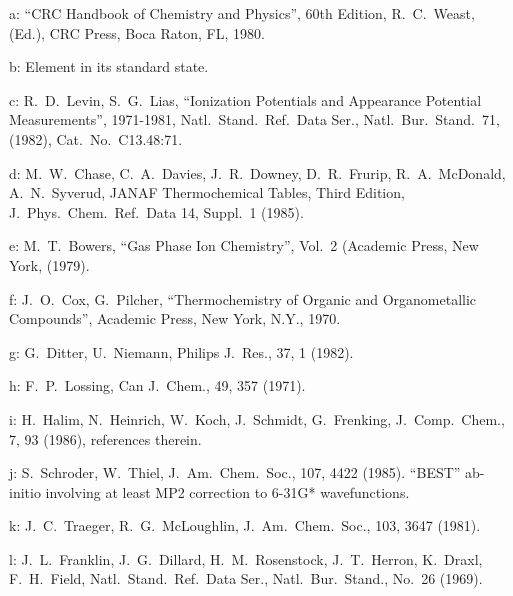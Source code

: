 \begin{description}
\item{   a: } ``CRC Handbook of Chemistry and Physics'', 60th Edition, R.\ C.\ Weast, (Ed.),
       CRC Press, Boca Raton, FL, 1980.
  
\item{   b: } Element in its standard state.
  
\item{   c: } R.\ D.\ Levin, S.\ G.\ Lias, ``Ionization Potentials and Appearance Potential
       Measurements'', 1971-1981, Natl.\ Stand.\ Ref.\ Data Ser., Natl.\ Bur.\
       Stand.\ 71, (1982), Cat.\ No.\ C13.48:71.
  
\item{   d: } M.\ W.\ Chase, C.\ A.\ Davies, J.\ R.\ Downey, D.\ R.\ Frurip, R.\ A.\ McDonald,
       A.\ N.\ Syverud, JANAF Thermochemical Tables, Third Edition,
       J.\ Phys.\ Chem.\ Ref.\ Data 14, Suppl.\ 1 (1985).
  
\item{   e: } M.\ T.\ Bowers, ``Gas Phase Ion Chemistry'', Vol.\ 2 (Academic Press, New York,
       (1979).
  
\item{   f: } J.\ O.\ Cox, G.\ Pilcher, ``Thermochemistry of Organic and Organometallic
       Compounds'', Academic Press, New York, N.Y., 1970.
  
\item{   g: } G.\ Ditter, U.\ Niemann, Philips J.\ Res., 37, 1 (1982).
  
\item{   h: } F.\ P.\ Lossing, Can J.\ Chem., 49, 357 (1971).
  
\item{   i: } H.\ Halim, N.\ Heinrich, W.\ Koch, J.\ Schmidt, G.\ Frenking, J.\ Comp.\ Chem.,
       7, 93 (1986), references therein.
  
\item{   j: } S.\ Schroder, W.\ Thiel, J.\ Am.\ Chem.\ Soc., 107, 4422 (1985). ``BEST'' ab-initio
       involving at least MP2 correction to 6-31G* wavefunctions.
  
\item{   k: } J.\ C.\ Traeger, R.\ G.\ McLoughlin, J.\ Am.\ Chem.\ Soc., 103, 3647 (1981).
  
\item{   l: } J.\ L.\ Franklin, J.\ G.\ Dillard, H.\ M.\ Rosenstock, J.\ T.\ Herron,
       K.\ Draxl, F.\ H.\ Field, Natl.\ Stand.\ Ref.\ Data Ser., Natl.\ Bur.\
       Stand., No.\ 26 (1969).
  

\end{description}
